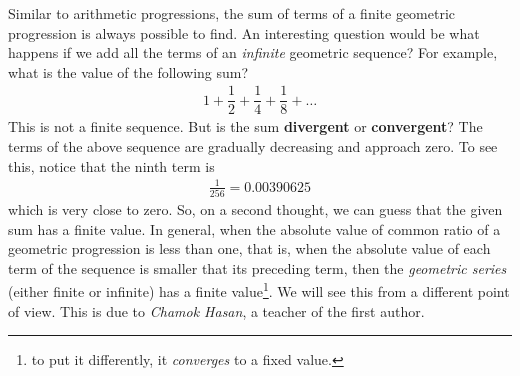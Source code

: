 Similar to arithmetic progressions, the sum of terms of a finite geometric progression is always possible to find. An interesting question would be what happens if we add all the terms of an \textit{infinite} geometric sequence? For example, what is the value of the following sum?
	\begin{align*}
		1 + \dfrac{1}{2}+ \dfrac{1}{4}+\dfrac{1}{8}+ \ldots
	\end{align*}
This is not a finite sequence. But is the sum \textbf{divergent} or \textbf{convergent}? The terms of the above sequence are gradually decreasing and approach zero. To see this, notice that the ninth term is
	\begin{align*}
		\frac{1}{256} = 0.00390625
	\end{align*}
which is very close to zero. So, on a second thought, we can guess that the given sum has a finite value. In general, when the absolute value of common ratio of a geometric progression is less than one, that is, when the absolute value of each term of the sequence is smaller that its preceding term, then the \textit{geometric series} (either finite or infinite) has a finite value\footnote{to put it differently, it \textit{converges} to a fixed value.}. We will see this from a different point of view. This is due to \textit{Chamok Hasan}, a teacher of the first author.

